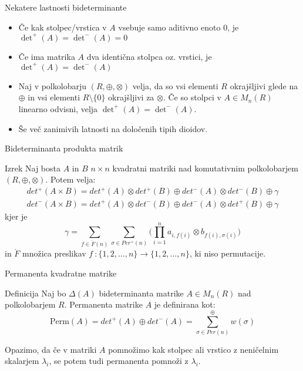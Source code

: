 \documentclass[t, 11pt]{beamer} %
\newcommand{\map}[3]{\ensuremath{{#1}~: {#2} \rightarrow {#3}}}
\begin{document}
\begin{frame}{Nekatere lastnosti bideterminante}
	\begin{itemize}
		\item Če kak stolpec/vrstica v $A$ vsebuje samo aditivno enoto $0$, je $\det^{+}(A) = \det^{-}(A) = 0$
		\item Če ima matrika $A$ dva identična stolpca oz. vrstici, je $\det^{+}(A) = \det^{-}(A)$
		\item Naj v polkolobarju $(R, \oplus, \otimes)$ velja, da so vsi elementi $R$ okrajšljivi glede na $\oplus$ in vsi elementi $R\setminus\{0\}$ okrajšljivi za $\otimes$. Če so stolpci v $A\in M_n(R)$ linearno odvisni, velja $\det^{+}(A) = \det^{-}(A)$.
		\item Še več zanimivih latnosti na določenih tipih dioidov.
	\end{itemize}
\end{frame}


\begin{frame}{Bideterminanta produkta matrik}
	\begin{block}{Izrek}
		Naj bosta $A$ in $B$ $n\times n$ kvadratni matriki nad komutativnim polkolobarjem $(R, \oplus, \otimes)$. Potem velja: \begin{align*}
			det^{+}(A\times B) = det^{+}(A) \otimes det^{+}(B) \oplus det^{-}(A) \otimes det^{-}(B) \oplus \gamma \\
			det^{-}(A\times B) = det^{+}(A) \otimes det^{-}(B) \oplus det^{-}(A) \otimes det^{+}(B) \oplus \gamma
		\end{align*}
		kjer je $$\gamma = \sum_{f \in \acute{F}(n)} \sum_{\sigma \in Per^{+}(n)} \bigg(\prod_{i=1}^{n} a_{i, f(i)} \otimes b_{f(i), \sigma(i)}\bigg)$$
		in $\acute{F}$ množica preslikav $\map{f}{\{1, 2, \ldots, n\}}{\{1, 2, \ldots, n\}}$, ki niso permutacije.
	\end{block}
\end{frame}

\begin{frame}{Permanenta kvadratne matrike}
	\begin{block}{Definicija}
		Naj bo $\Delta(A)$ bideterminanta matrike $A\in M_n(R)$ nad polkolobarjem $R$. Permanenta matrike $A$ je definirana kot: $$\text{Perm}(A) = det^{+}(A) \oplus det^{-}(A) = \sum_{\sigma\in Per(n)}^{\oplus} w(\sigma)$$		
	\end{block}
Opazimo, da če v matriki $A$ pomnožimo kak stolpec ali vrstico z neničelnim skalarjem $\lambda_i$, se potem tudi permanenta pomnoži z $\lambda_i$.
\end{frame}
\end{document}

